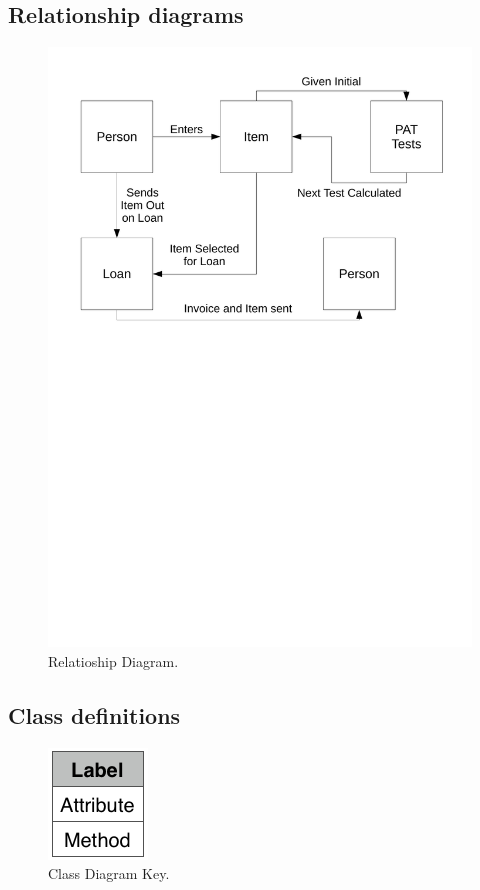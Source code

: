 \subsection{Relationship diagrams}

\begin{figure}[H]
    \includegraphics[width=\textwidth]{./Analysis/Relationship_Diagrams/Relationships_diagrams.pdf}
    \caption{Relatioship Diagram.} \label{fig:relationship_diadram}
\end{figure}

\newpage

\subsection{Class definitions}

\begin{figure}[H]
    \centerline{\includegraphics[width=100px]{./Analysis/Class_Definitions/Class_definition_key.pdf}}
    \caption{Class Diagram Key.} \label{fig:relationship_diagram}
\end{figure}


